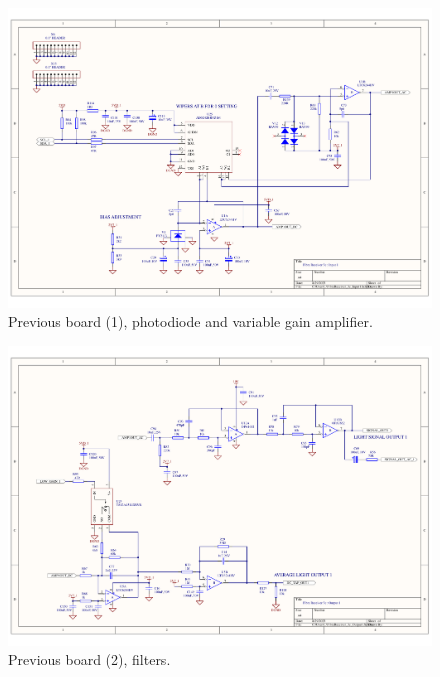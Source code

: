 \begin{figure}[H]
\centering
\includegraphics[width=0.9\linewidth]{4-ANC_Sys/FibreReceiver_3c_Input1.pdf}
\caption{Previous board (1), photodiode and variable gain amplifier.}
\label{fig_DavidBoardIn}
\end{figure}

\begin{figure}[h]
\centering
\includegraphics[width=0.9\linewidth]{4-ANC_Sys/FibreReceiver_3c_Output1.pdf}
\caption{Previous board (2), filters.}
\label{fig_DavidBoardOut}
\end{figure}


